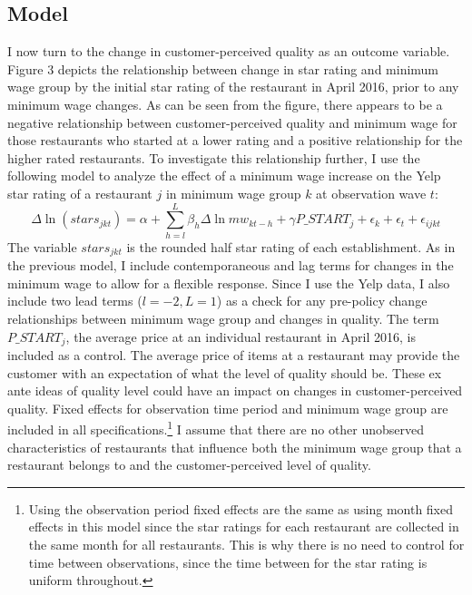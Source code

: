\documentclass[11pt]{article}
\begin{document}
\subsection{Model}
I now turn to the change in customer-perceived quality as an outcome variable. Figure 3 depicts the relationship between change in star rating and minimum wage group by the initial star rating of the restaurant in April 2016, prior to any minimum wage changes. As can be seen from the figure, there appears to be a negative relationship between customer-perceived quality and minimum wage for those restaurants who started at a lower rating and a positive relationship for the higher rated restaurants. To investigate this relationship further, I use the following model to analyze the effect of a minimum wage increase on the Yelp star rating of a restaurant $j$ in minimum wage group $k$ at observation wave $t$:
\begin{dmath}
\Delta \ln(stars_{jkt}) = \alpha + \sum_{h=l}^{L}\beta_h \Delta \ln mw_{kt-h}  + \gamma  P\_START_{j} + \epsilon_k + \epsilon_t + \epsilon_{ijkt}
\end{dmath}
The variable $stars_{jkt}$ is the rounded half star rating of each establishment. As in the previous model, I include contemporaneous and lag terms for changes in the minimum wage to allow for a flexible response. Since I use the Yelp data, I also include two lead terms ($l=-2,L=1$) as a check for any pre-policy change relationships between minimum wage group and changes in quality. The term $P\_START_j$, the average price at an individual restaurant in April 2016, is included as a control. The average price of items at a restaurant may provide the customer with an expectation of what the level of quality should be. These ex ante ideas of quality level could have an impact on changes in customer-perceived quality. Fixed effects for observation time period and minimum wage group are included in all specifications.\footnote{Using the observation period fixed effects are the same as using month fixed effects in this model since the star ratings for each restaurant are collected in the same month for all restaurants. This is why there is no need to control for time between observations, since the time between for the star rating is uniform throughout.} I assume that there are no other unobserved characteristics of restaurants that influence both the minimum wage group that a restaurant belongs to and the customer-perceived level of quality. 
\end{document}
